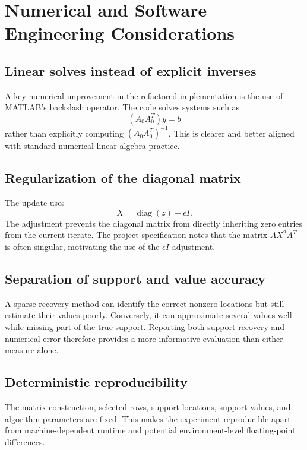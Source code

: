 \documentclass[11pt]{article}
\newcommand{\diag}{\operatorname{diag}}
\begin{document}
\section{Numerical and Software Engineering Considerations}
\subsection{Linear solves instead of explicit inverses}

A key numerical improvement in the refactored implementation is the use of MATLAB's backslash operator. The code solves systems such as
\[
(A_0A_0^T)y=b
\]
rather than explicitly computing $(A_0A_0^T)^{-1}$. This is clearer and better aligned with standard numerical linear algebra practice.

\subsection{Regularization of the diagonal matrix}

The update uses
\[
X=\diag(z)+\epsilon I.
\]
The adjustment prevents the diagonal matrix from directly inheriting zero entries from the current iterate. The project specification notes that the matrix $AX^2A^T$ is often singular, motivating the use of the $\epsilon I$ adjustment.

\subsection{Separation of support and value accuracy}

A sparse-recovery method can identify the correct nonzero locations but still estimate their values poorly. Conversely, it can approximate several values well while missing part of the true support. Reporting both support recovery and numerical error therefore provides a more informative evaluation than either measure alone.

\subsection{Deterministic reproducibility}

The matrix construction, selected rows, support locations, support values, and algorithm parameters are fixed. This makes the experiment reproducible apart from machine-dependent runtime and potential environment-level floating-point differences.
\end{document}
